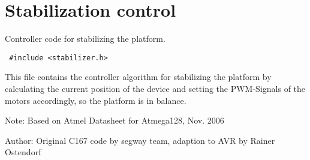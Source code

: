 \section{Stabilization control}
\label{group__ro__stabilizer}
Controller code for stabilizing the platform.  


\begin{Code}\begin{verbatim} #include <stabilizer.h> 
\end{verbatim}\end{Code}



This file contains the controller algorithm for stabilizing the platform by calculating the current position of the device and setting the PWM-Signals of the motors accordingly, so the platform is in balance.

\begin{Desc}
\item[Note:]Based on Atmel Datasheet for Atmega128, Nov. 2006 \end{Desc}
\begin{Desc}
\item[Author:]Original C167 code by segway team, adaption to AVR by Rainer Ostendorf \end{Desc}
